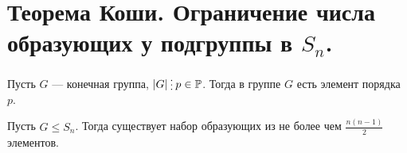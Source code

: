 % 
% 
\section{Теорема Коши. Ограничение числа образующих у подгруппы в $ S_{n} $.}
\begin{thm}[Коши]
    Пусть $ G$ --- конечная группа,  $ \lvert G \rvert \del p \in \Pm$. Тогда в группе $ G$ есть элемент порядка  $ p$.
\end{thm}
\begin{thm}
    Пусть $ G \le S_{n} $. Тогда существует набор образующих из не более чем $ \frac{n(n-1)}{2}$ элементов.
\end{thm}
% 
